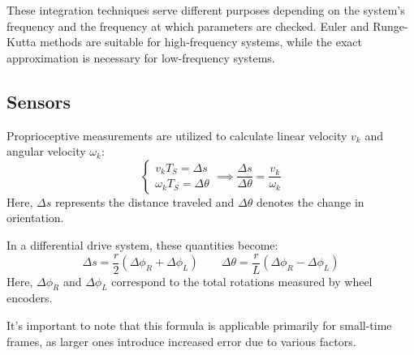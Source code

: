 These integration techniques serve different purposes depending on the system's frequency and the frequency at which parameters are checked. 
Euler and Runge-Kutta methods are suitable for high-frequency systems, while the exact approximation is necessary for low-frequency systems.

\subsection{Sensors}
Proprioceptive measurements are utilized to calculate linear velocity $v_k$ and angular velocity $\omega_k$:
\[\begin{cases}
    v_kT_S=\Delta s \\
    \omega_kT_S=\Delta\theta
\end{cases} \implies \dfrac{\Delta s}{\Delta\theta}=\dfrac{v_k}{\omega_k}\]
Here, $\Delta s$ represents the distance traveled and $\Delta\theta$ denotes the change in orientation.

In a differential drive system, these quantities become:
\[\Delta s=\dfrac{r}{2}\left(\Delta\phi_R+\Delta\phi_L\right) \qquad \Delta\theta=\dfrac{r}{L}\left(\Delta\phi_R-\Delta\phi_L\right)\]
Here, $\Delta\phi_R$ and $\Delta\phi_L$ correspond to the total rotations measured by wheel encoders.

It's important to note that this formula is applicable primarily for small-time frames, as larger ones introduce increased error due to various factors.